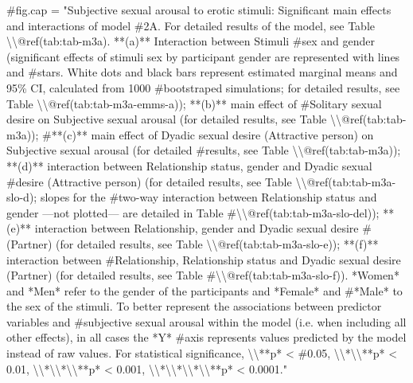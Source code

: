 \documentclass[
  bookmarksnumbered]{article}
\newenvironment{Shaded}{\begin{snugshade}}{\end{snugshade}}
\newcommand{\CommentTok}[1]{\textcolor[rgb]{0.50,0.62,0.50}{#1}}
\begin{document}
\begin{Shaded}
\begin{Highlighting}[]
\CommentTok{\#fig.cap = "Subjective sexual arousal to erotic stimuli: Significant main effects and interactions of model \#2A. For detailed results of the model, see Table \textbackslash{}\textbackslash{}@ref(tab:tab{-}m3a). **(a)** Interaction between Stimuli \#sex and gender (significant effects of stimuli sex by participant gender are represented with lines and \#stars. White dots and black bars represent estimated marginal means and 95\% CI, calculated from 1000 \#bootstraped simulations; for detailed results, see Table \textbackslash{}\textbackslash{}@ref(tab:tab{-}m3a{-}emms{-}a)); **(b)** main effect of \#Solitary sexual desire on Subjective sexual arousal (for detailed results, see Table \textbackslash{}\textbackslash{}@ref(tab:tab{-}m3a)); \#**(c)** main effect of Dyadic sexual desire (Attractive person) on Subjective sexual arousal  (for detailed \#results, see Table \textbackslash{}\textbackslash{}@ref(tab:tab{-}m3a)); **(d)** interaction between Relationship status, gender and Dyadic sexual \#desire (Attractive person) (for detailed results, see Table \textbackslash{}\textbackslash{}@ref(tab:tab{-}m3a{-}slo{-}d); slopes for the \#two{-}way interaction between Relationship status and gender —not plotted— are detailed in Table \#\textbackslash{}\textbackslash{}@ref(tab:tab{-}m3a{-}slo{-}del)); **(e)** interaction between Relationship, gender and Dyadic sexual desire \#(Partner) (for detailed results, see Table \textbackslash{}\textbackslash{}@ref(tab:tab{-}m3a{-}slo{-}e)); **(f)** interaction between \#Relationship, Relationship status and Dyadic sexual desire (Partner) (for detailed results, see Table \#\textbackslash{}\textbackslash{}@ref(tab:tab{-}m3a{-}slo{-}f)). *Women* and *Men* refer to the gender of the participants and *Female* and \#*Male* to the sex of the stimuli. To better represent the associations between predictor variables and \#subjective sexual arousal within the model (i.e. when including all other effects), in all cases the *Y* \#axis represents values predicted by the model instead of raw values. For statistical significance, \textbackslash{}\textbackslash{}**p* \textless{} \#0.05, \textbackslash{}\textbackslash{}*\textbackslash{}\textbackslash{}**p* \textless{} 0.01, \textbackslash{}\textbackslash{}*\textbackslash{}\textbackslash{}*\textbackslash{}\textbackslash{}**p* \textless{} 0.001, \textbackslash{}\textbackslash{}*\textbackslash{}\textbackslash{}*\textbackslash{}\textbackslash{}*\textbackslash{}\textbackslash{}**p* \textless{} 0.0001."}



\end{Highlighting}
\end{Shaded}
\end{document}
